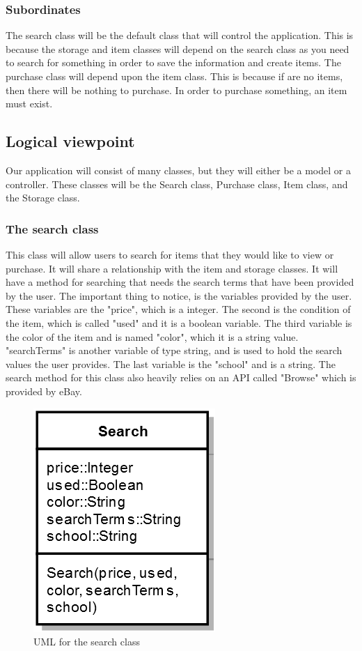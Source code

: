\documentclass[journal,compsoc, 10pt, draftclsnofoot, onecolumn]{IEEEtran}
\begin{document}
\subsubsection*{Subordinates}
The search class will be the default class that will control the application. 
This is because the storage and item classes will depend on the search class 
as you need to search for something in order to save the information and create 
items. The purchase class will depend upon the item class. This is because if 
are no items, then there will be nothing to purchase. In order to purchase 
something, an item must exist. 

\subsection{Logical viewpoint}
Our application will consist of many classes, but they will either be a model or 
a controller. These classes will be the Search class, Purchase class, Item class, 
and the Storage class.

\subsubsection*{The search class}
This class will allow users to search for items that they would like to view or 
purchase. It will share a relationship with the item and storage classes. It 
will have a method for searching that needs the search terms that have been 
provided by the user. The important thing to notice, is the variables provided 
by the user. These variables are the "price", which is a integer. The second is 
the condition of the item, which is called "used" and it is a boolean variable. 
The third variable is the color of the item and is named "color", which it is a 
string value. "searchTerms" is another variable of type string, and is used to 
hold the search values the user provides. The last variable is the "school" and 
is a string. The search method for this class also heavily relies on an API 
called "Browse" which is provided by eBay.

\begin{figure}[h]
\centering
\caption{UML for the search class}
\includegraphics[scale=.9]{searchUML}
\end{figure}
\FloatBarrier
\end{document}
